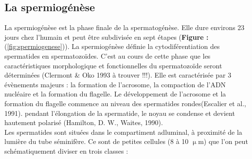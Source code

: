 \documentclass[12pt,twoside]{reedthesis}
\theoremstyle{definition}
\theoremstyle{definition}
\theoremstyle{remark}
\begin{document}
  \subsection{La spermiogénèse}\label{la-spermiogenese}
  
  La spermiogénèse est la phase finale de la spermatogénèse. Elle dure
  environs 23 jours chez l'humain et peut être subdivisée en sept étapes
  (\textbf{Figure : }(\ref{fig:spermiogenese})). La spermiogénèse définie
  la cytodiférentiation des spermatides en spermatozoïdes. C'est au cours
  de cette phase que les caractéristiques morphologique et fonctionnelles
  du spermatozoïde seront déterminées (Clermont \& Oko 1993 à trouver
  !!!). Elle est caractérisée par 3 évènements majeurs : la formation de
  l'acrosome, la compaction de l'ADN nucléaire et la formation du
  flagelle. Le développement de l'acrosome et la formation du flagelle
  commence au niveau des spermatides rondes(Escalier et al., 1991).
  pendant l'élongation de la spermatide, le noyau se condense et devient
  hautement polarisé (Hamilton, D. W., Waites, 1990).\\
  Les spermatides sont situées dans le compartiment adluminal, à proximité
  de la lumière du tube séminifère. Ce sont de petites cellules (8 à 10
  \(\upmu\)m) que l'on peut schématiquement diviser en trois classes :
  
\end{document}
